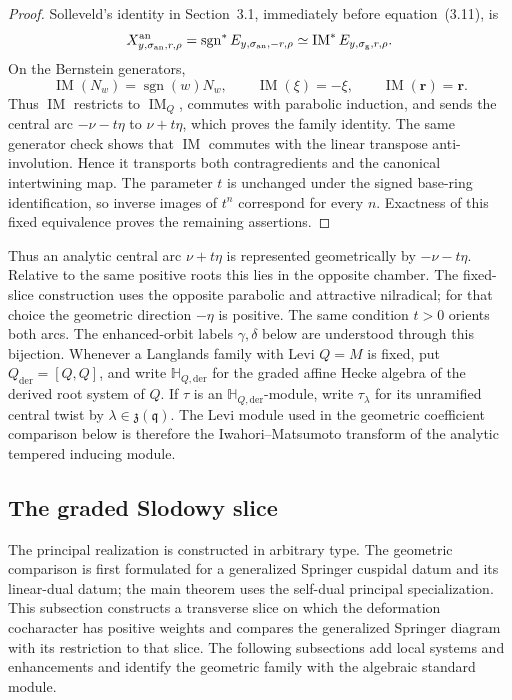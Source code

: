 \documentclass[11pt]{amsart}
\theoremstyle{definition}
\theoremstyle{remark}
\newcommand{\Hh}{\mathbb H}
\begin{document}
\begin{proof}
Solleveld's identity in Section~3.1, immediately before equation~(3.11), is
\[
 X^{\rm an}_{y,\sigma_{\rm an},r,\rho}
 =\operatorname{sgn}^{*}E_{y,\sigma_{\rm an},-r,\rho}
 \simeq \operatorname{IM}^{*}E_{y,\sigma_{\rm g},r,\rho}.
\]
On the Bernstein generators,
\[
 \operatorname{IM}(N_w)=\operatorname{sgn}(w)N_w,\qquad
 \operatorname{IM}(\xi)=-\xi,\qquad
 \operatorname{IM}(\mathbf r)=\mathbf r.
\]
Thus $\operatorname{IM}$ restricts to $\operatorname{IM}_Q$, commutes with
parabolic induction, and sends the central arc $-\nu-t\eta$ to
$\nu+t\eta$, which proves the family identity.  The same generator check
shows that $\operatorname{IM}$ commutes with the linear transpose
anti-involution.  Hence it transports both contragredients and the canonical
intertwining map.  The parameter $t$ is unchanged under the signed
base-ring identification, so inverse images of $t^n$ correspond for every
$n$.  Exactness of this fixed equivalence proves the remaining assertions.
\end{proof}

Thus an analytic central arc $\nu+t\eta$ is represented geometrically by
$-\nu-t\eta$.  Relative to the same positive roots this lies in the opposite
chamber.  The fixed-slice construction uses the opposite parabolic and
attractive nilradical; for that choice the geometric direction $-\eta$
is positive.  The same condition $t>0$ orients both arcs.  The enhanced-orbit
labels $\gamma,\delta$ below are understood through this bijection.  Whenever
a Langlands family with Levi $Q=M$ is fixed, put
$Q_{\mathrm{der}}=[Q,Q]$, and write $\Hh_{Q,\mathrm{der}}$ for the graded
affine Hecke algebra of the derived root system of $Q$.  If $\tau$ is an
$\Hh_{Q,\mathrm{der}}$-module, write $\tau_\lambda$ for its unramified
central twist by $\lambda\in\mathfrak z(\mathfrak q)$.  The Levi module used
in the geometric coefficient comparison below is therefore the
Iwahori--Matsumoto transform of the analytic tempered inducing module.

\subsection{The graded Slodowy slice}
\label{sec:graded-slodowy-slice}

The principal realization is constructed in arbitrary type.  The geometric
comparison is first formulated for a generalized Springer cuspidal datum and
its linear-dual datum; the main theorem uses the self-dual principal
specialization.  This subsection constructs a transverse slice on which the
deformation cocharacter has positive weights and compares the generalized
Springer diagram with its restriction to that slice.  The following
subsections add local systems and enhancements and identify the geometric
family with the algebraic standard module.
\end{document}
